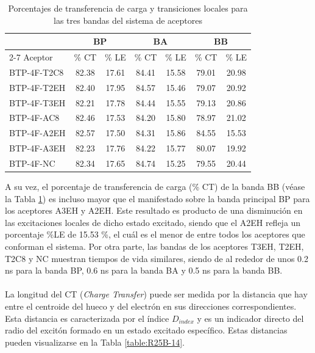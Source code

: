 \begin{table}[H]
\caption{Porcentajes de transferencia de carga y transiciones locales para las tres bandas del sistema de aceptores}
\label{table:R25B-13} 
\centering 
\begin{tabular}{lcccccc} 
\hline
 & \multicolumn{2}{c}{BP} & \multicolumn{2}{c}{BA} & \multicolumn{2}{c}{BB} \\ \cline{2-7}
Aceptor & \% CT & \% LE & \% CT & \% LE & \% CT & \% LE \\ \hline
BTP-4F-T2C8 & 82.38 & 17.61 & 84.41 & 15.58 & 79.01 & 20.98 \\
BTP-4F-T2EH & 82.40 & 17.95 & 84.57 & 15.46 & 79.07 & 20.92 \\
BTP-4F-T3EH & 82.21 & 17.78 & 84.44 & 15.55 & 79.13 & 20.86 \\
BTP-4F-AC8  & 82.46 & 17.53 & 84.20 & 15.80 & 78.97 & 21.02 \\
BTP-4F-A2EH & 82.57 & 17.50 & 84.31 & 15.86 & 84.55 & 15.53 \\
BTP-4F-A3EH & 82.23 & 17.76 & 84.22 & 15.77 & 80.07 & 19.92 \\
BTP-4F-NC   & 82.34 & 17.65 & 84.74 & 15.25 & 79.55 & 20.44 \\ \hline
\end{tabular}
\end{table} 
\noindent A su vez, el porcentaje de transferencia de carga (\% CT) de la banda BB (véase la Tabla \ref{table:R25B-13}) es incluso mayor que el manifestado sobre la banda principal BP para los aceptores A3EH y A2EH. Este resultado es producto de una disminución en las excitaciones locales de dicho estado excitado, siendo que el A2EH refleja un porcentaje \%LE de 15.53 \%, el cuál es el menor de entre todos los aceptores que conforman el sistema. Por otra parte, las bandas de los aceptores T3EH, T2EH, T2C8 y NC muestran tiempos de vida similares, siendo de al rededor de unos 0.2 ns para la banda BP, 0.6 ns para la banda BA y 0.5 ns para la banda BB. \\ \\ 
La longitud del CT (\textit{Charge Transfer}) puede ser medida por la distancia que hay entre el centroide del hueco y del electrón en sus direcciones correspondientes. Esta distancia es caracterizada por el índice $D_{index}$ y es un indicador directo del radio del excitón formado en un estado excitado específico. Estas distancias pueden visualizarse en la Tabla \ref{table:R25B-14}. 
